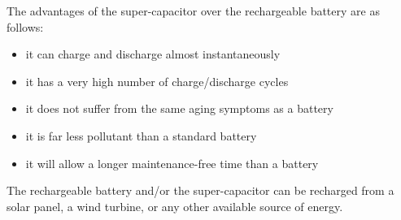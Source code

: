 The advantages of the super-capacitor over the rechargeable battery are as follows:

\begin{itemize}
\item it can charge and discharge almost instantaneously 
\item it has a very high number of charge/discharge cycles 
\item it does not suffer from the same aging symptoms as a battery
\item it is far less pollutant than a standard battery
\item it will allow a longer maintenance-free time than a battery

\end{itemize}

The rechargeable battery and/or the super-capacitor can be recharged from a solar panel, a wind turbine, or any other available source of energy.
